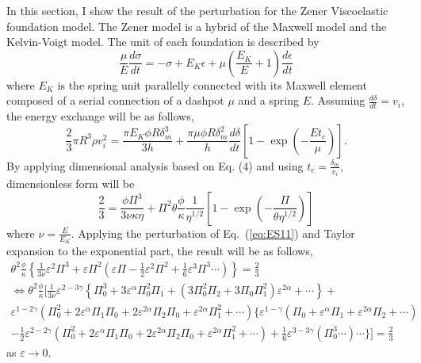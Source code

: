 \documentclass[aps,prl,superscriptaddress]{revtex4}  %
\begin{document}
In this section, I show the result of the perturbation for the Zener Viscoelastic foundation model. The Zener model is a hybrid of the Maxwell model and the Kelvin-Voigt model. The unit of each foundation is described by 
\begin{equation}
\frac{\mu}{E}\frac{d \sigma}{dt} = -\sigma + E_K \epsilon + \mu \left(  \frac{E_K}{E}+1\right) \frac{d \epsilon}{dt}
\label{eq:ES23}
\end{equation}
where $E_K$ is the spring unit parallelly connected with its Maxwell element composed of a serial connection of a dashpot $\mu$ and a spring $E$.  Assuming $\frac{d \delta}{dt} = v_i$, the energy exchange will be as follows,
\begin{equation}
\frac{2}{3} \pi R^3 \rho v_i^2   = \frac{ \pi E_K \phi R \delta_m^3}{3 h } +  \frac{ \pi \mu \phi R \delta_m^2}{ h }\frac{d \delta}{dt}\left[ 1-\exp \left(- \frac{E t_c}{\mu}\right) \right] .
\label{eq:ES24}
\end{equation}
By applying dimensional analysis based on Eq. (4) and using $t_c = \frac{\delta_m}{v_i}$, dimensionless form will be 
\begin{equation}
\frac{2}{3}  = \frac{ \phi \Pi^3 }{3 \nu \kappa \eta } + \Pi^2 \theta \frac{\phi }{\kappa} \frac{1}{\eta^{1/2}}\left[1 - \exp \left( -\frac{\Pi}{\theta \eta^{1/2}} \right) \right]
\label{eq:ES25}
\end{equation}
where $\nu = \frac{E}{E_K}$.  Applying the perturbation of Eq.~(\ref{eq:ES11}) and Taylor expansion to the exponential part, the result will be as follows,
%
\begin{eqnarray}
\theta^2 \frac{\phi }{\kappa} \left\{  \frac{1}{3 \nu} \varepsilon^2 \Pi^3 +   \varepsilon \Pi^2\left( \varepsilon \Pi  - \frac{1}{2}\varepsilon^2 \Pi^2 + \frac{1}{6}\varepsilon^3 \Pi^3 \cdots  \right) \right\} =  \frac{2}{3}  \nonumber   \\ 
\Leftrightarrow \theta^2 \frac{\phi }{\kappa} [ \frac{1}{3\nu} \varepsilon^{2-3\gamma} \left\{ \Pi_0^3 +3\varepsilon^{\alpha}\Pi_0^2 \Pi_1 + \left( 3 \Pi_0^2 \Pi_2 + 3 \Pi_0 \Pi_1^2 \right) \varepsilon^{2 \alpha}   + \cdots  \right\} +   \nonumber  \\  
\varepsilon^{1-2 \gamma} \left( \Pi_0^2  + 2 \varepsilon^{\alpha} \Pi_1 \Pi_0 +  2 \varepsilon^{2 \alpha} \Pi_2 \Pi_0 +  \varepsilon^{2 \alpha} \Pi_1^2 + \cdots  \right) \{ \varepsilon^{1-\gamma} \left(\Pi_0 + \varepsilon^{\alpha} \Pi_1 + \varepsilon^{2\alpha} \Pi_2 + \cdots \right)   \nonumber  \\  
- \frac{1}{2}\varepsilon^{2-2 \gamma} \left(\Pi_0^2  + 2 \varepsilon^{\alpha} \Pi_1 \Pi_0 +  2 \varepsilon^{2 \alpha} \Pi_2 \Pi_0 +  \varepsilon^{2 \alpha} \Pi_1^2 + \cdots \right) + \frac{1}{6}\varepsilon^{3-3 \gamma} \left(\Pi_0^3 \cdots \right)\cdots \} ] = \frac{2}{3} 
\label{eq:ES26}
\end{eqnarray}
%
as $\varepsilon \rightarrow 0$.
\end{document}
